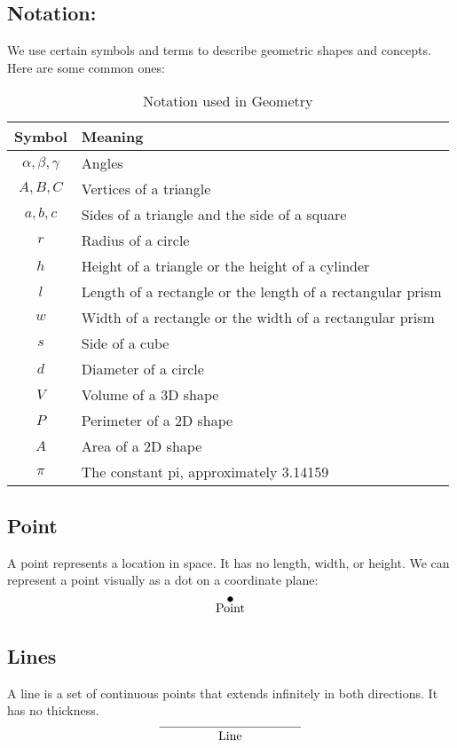 \subsection{\textbf{Notation:}}
We use certain symbols and terms to describe geometric shapes and concepts. Here are some common ones:
\begin{table}[h!]
    \centering
    \begin{tabular}{|c|l|}
        \hline
        \textbf{Symbol} & \textbf{Meaning} \\ \hline
        $\alpha, \beta, \gamma$ & Angles \\ \hline
        $A, B, C$ & Vertices of a triangle \\ \hline
        $a, b, c$ & Sides of a triangle and the side of a square \\ \hline
        $r$ & Radius of a circle \\ \hline
        $h$ & Height of a triangle or the height of a cylinder \\ \hline
        $l$ & Length of a rectangle or the length of a rectangular prism \\ \hline
        $w$ & Width of a rectangle or the width of a rectangular prism \\ \hline
        $s$ & Side of a cube \\ \hline
        $d$ & Diameter of a circle \\ \hline
        $V$ & Volume of a 3D shape \\ \hline
        $P$ & Perimeter of a 2D shape \\ \hline
        $A$ & Area of a 2D shape \\ \hline
        $\pi$ & The constant pi, approximately 3.14159 \\ \hline
    \end{tabular}
    \caption{Notation used in Geometry}
    \label{tab:notation}
\end{table}

\subsection{Point}
A point represents a location in space. It has no length, width, or height.
We can represent a point visually as a dot on a coordinate plane:
\[
\begin{tikzpicture}
    \filldraw (0,0) circle (2pt);
    \node[below] at (0,0) {Point};
\end{tikzpicture}
\]

\subsection{Lines}
A line is a set of continuous points that extends infinitely in both directions. It has no thickness.
\[
\begin{tikzpicture}
    \draw (-2,0) -- (2,0);
    \node[below] at (0,0) {Line};
\end{tikzpicture}
\]

